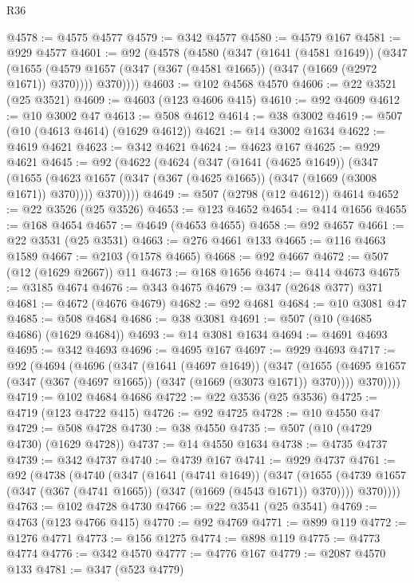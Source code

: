 \begin{lexlean}{R36}
\begin{coremodule}
@4578 := @4575 @4577
@4579 := @342 @4577
@4580 := @4579 @167
@4581 := @929 @4577
@4601 := @92
    (@4578
      (@4580
        (@347
          (@1641 (@4581 @1649))
          (@347
            (@1655 (@4579 @1657 (@347 (@367 (@4581 @1665)) (@347 (@1669 (@2972 @1671)) @370))))
            @370))))
@4603 := @102 @4568 @4570
@4606 := @22 @3521 (@25 @3521)
@4609 := @4603 (@123 @4606 @415)
@4610 := @92 @4609
@4612 := @10 @3002 @47
@4613 := @508 @4612
@4614 := @38 @3002
@4619 := @507 (@10 (@4613 @4614) (@1629 @4612))
@4621 := @14 @3002 @1634
@4622 := @4619 @4621
@4623 := @342 @4621
@4624 := @4623 @167
@4625 := @929 @4621
@4645 := @92
    (@4622
      (@4624
        (@347
          (@1641 (@4625 @1649))
          (@347
            (@1655 (@4623 @1657 (@347 (@367 (@4625 @1665)) (@347 (@1669 (@3008 @1671)) @370))))
            @370))))
@4649 := @507 (@2798 (@12 @4612)) @4614
@4652 := @22 @3526 (@25 @3526)
@4653 := @123 @4652
@4654 := @414 @1656
@4655 := @168 @4654
@4657 := @4649 (@4653 @4655)
@4658 := @92 @4657
@4661 := @22 @3531 (@25 @3531)
@4663 := @276 @4661 @133
@4665 := @116 @4663 @1589
@4667 := @2103 (@1578 @4665)
@4668 := @92 @4667
@4672 := @507 (@12 (@1629 @2667)) @11
@4673 := @168 @1656
@4674 := @414 @4673
@4675 := @3185 @4674
@4676 := @343 @4675
@4679 := @347 (@2648 @377) @371
@4681 := @4672 (@4676 @4679)
@4682 := @92 @4681
@4684 := @10 @3081 @47
@4685 := @508 @4684
@4686 := @38 @3081
@4691 := @507 (@10 (@4685 @4686) (@1629 @4684))
@4693 := @14 @3081 @1634
@4694 := @4691 @4693
@4695 := @342 @4693
@4696 := @4695 @167
@4697 := @929 @4693
@4717 := @92
    (@4694
      (@4696
        (@347
          (@1641 (@4697 @1649))
          (@347
            (@1655 (@4695 @1657 (@347 (@367 (@4697 @1665)) (@347 (@1669 (@3073 @1671)) @370))))
            @370))))
@4719 := @102 @4684 @4686
@4722 := @22 @3536 (@25 @3536)
@4725 := @4719 (@123 @4722 @415)
@4726 := @92 @4725
@4728 := @10 @4550 @47
@4729 := @508 @4728
@4730 := @38 @4550
@4735 := @507 (@10 (@4729 @4730) (@1629 @4728))
@4737 := @14 @4550 @1634
@4738 := @4735 @4737
@4739 := @342 @4737
@4740 := @4739 @167
@4741 := @929 @4737
@4761 := @92
    (@4738
      (@4740
        (@347
          (@1641 (@4741 @1649))
          (@347
            (@1655 (@4739 @1657 (@347 (@367 (@4741 @1665)) (@347 (@1669 (@4543 @1671)) @370))))
            @370))))
@4763 := @102 @4728 @4730
@4766 := @22 @3541 (@25 @3541)
@4769 := @4763 (@123 @4766 @415)
@4770 := @92 @4769
@4771 := @899 @119
@4772 := @1276 @4771
@4773 := @156 @1275
@4774 := @898 @119
@4775 := @4773 @4774
@4776 := @342 @4570
@4777 := @4776 @167
@4779 := @2087 @4570 @133
@4781 := @347 (@523 @4779)

\end{coremodule}
\end{lexlean}
